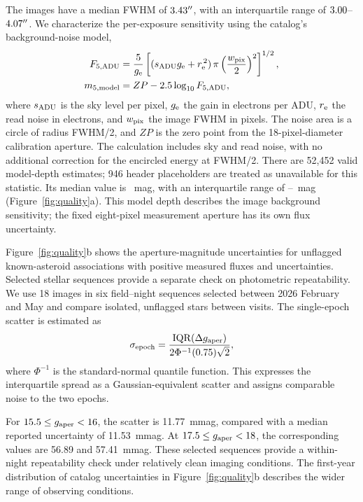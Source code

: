 The images have a median FWHM of $3.43^{\prime\prime}$, with an
interquartile range of $3.00$--$4.07^{\prime\prime}$.
We characterize the per-exposure sensitivity using the catalog's
background-noise model,
\begin{align}
F_{5,\rm ADU} &=\frac{5}{g_{\rm e}}
 \left[(s_{\rm ADU}g_{\rm e}+r_{\rm e}^{\,2})\,
 \pi\left(\frac{w_{\rm pix}}{2}\right)^2\right]^{1/2},\\
m_{5,\rm model} &= ZP-2.5\log_{10}F_{5,\rm ADU},
\label{eq:depth}
\end{align}
where $s_{\rm ADU}$ is the sky level per pixel, $g_{\rm e}$ the gain
in electrons per ADU, $r_{\rm e}$ the read noise in electrons,
and $w_{\rm pix}$ the image FWHM in pixels. The noise area is a
circle of radius FWHM/2, and $ZP$ is the zero point from the
18-pixel-diameter calibration aperture. The calculation includes
sky and read noise, with no additional correction for the
encircled energy at FWHM/2. There are 52,452 valid model-depth estimates; 946 header placeholders are treated as unavailable for this statistic. Its median value is \yrDepth~mag,
with an interquartile range of \yrDepthLow--\yrDepthHigh~mag
(Figure~\ref{fig:quality}a). This model depth describes the image
background sensitivity; the fixed eight-pixel measurement aperture
has its own flux uncertainty.

Figure~\ref{fig:quality}b shows the aperture-magnitude uncertainties
for unflagged known-asteroid associations with positive measured
fluxes and uncertainties. Selected stellar sequences provide a
separate check on photometric repeatability. We use 18 images in
six field--night sequences selected between 2026 February and May and compare isolated, unflagged stars
between visits. The single-epoch scatter is estimated as
\begin{equation}
\sigma_{\rm epoch}=\frac{\mathrm{IQR}(\Delta g_{\rm aper})}
 {2\Phi^{-1}(0.75)\sqrt{2}},
\label{eq:repeatability}
\end{equation}
where $\Phi^{-1}$ is the standard-normal quantile function.
This expresses the interquartile spread as a Gaussian-equivalent
scatter and assigns comparable noise to the two epochs.

For $15.5\leq g_{\rm aper}<16$, the scatter is 11.77~mmag, compared
with a median reported uncertainty of 11.53~mmag. At
$17.5\leq g_{\rm aper}<18$, the corresponding values are
56.89 and 57.41~mmag. These selected sequences provide a
within-night repeatability check under relatively clean imaging
conditions. The first-year distribution of catalog uncertainties
in Figure~\ref{fig:quality}b describes the wider range of
observing conditions.

